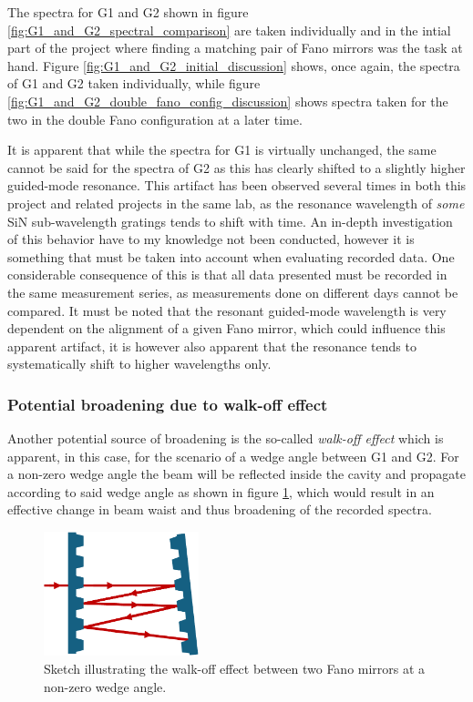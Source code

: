 The spectra for G1 and G2 shown in figure \ref{fig:G1_and_G2_spectral_comparison} are taken individually and in the intial part of the project where finding a matching pair of Fano mirrors was the task at hand. Figure \ref{fig:G1_and_G2_initial_discussion} shows, once again, the spectra of G1 and G2 taken individually, while figure \ref{fig:G1_and_G2_double_fano_config_discussion} shows spectra taken for the two in the double Fano configuration at a later time.

It is apparent that while the spectra for G1 is virtually unchanged, the same cannot be said for the spectra of G2 as this has clearly shifted to a slightly higher guided-mode resonance. This artifact has been observed several times in both this project and related projects in the same lab, as the resonance wavelength of \emph{some} SiN sub-wavelength gratings tends to shift with time. An in-depth investigation of this behavior have to my knowledge not been conducted, however it is something that must be taken into account when evaluating recorded data. One considerable consequence of this is that all data presented must be recorded in the same measurement series, as measurements done on different days cannot be compared. It must be noted that the resonant guided-mode wavelength is very dependent on the alignment of a given Fano mirror, which could influence this apparent artifact, it is however also apparent that the resonance tends to systematically shift to higher wavelengths only. 

\subsubsection{Potential broadening due to walk-off effect}

Another potential source of broadening is the so-called \emph{walk-off effect} which is apparent, in this case, for the scenario of a wedge angle between G1 and G2. For a non-zero wedge angle the beam will be reflected inside the cavity and propagate according to said wedge angle as shown in figure \ref{fig:walk_off_sketch}, which would result in an effective change in beam waist and thus broadening of the recorded spectra.

\begin{figure}[h!]
    \centering
    \includegraphics[width=0.4\textwidth]{figures/walk_off_sketch.pdf}
    \caption{Sketch illustrating the walk-off effect between two Fano mirrors at a non-zero wedge angle.}
    \label{fig:walk_off_sketch}
\end{figure}

